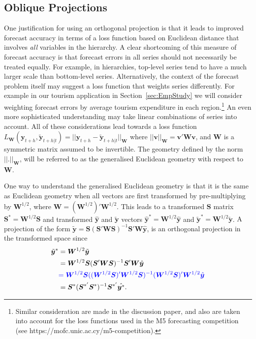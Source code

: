 \documentclass[12pt]{article}
\theoremstyle{definition}
\begin{document}
\subsection{Oblique Projections}\label{sec:oblique}

One justification for using an orthogonal projection is that it leads to improved forecast accuracy in terms of {\color{blue} a loss function based on Euclidean distance that involves \emph{all} variables in the hierarchy.} A clear shortcoming of this measure of forecast accuracy is that forecast errors in all series should not necessarily be treated equally. For example, in hierarchies, top-level series tend to have a much larger scale than bottom-level series.  {\color{blue} Alternatively, the context of the forecast problem itself may suggest a loss function that weights series differently.  For example in our tourism application in Section~\ref{sec:EmpStudy} we will consider weighting forecast errors by average tourism expenditure in each region.}\footnote{Similar consideration are made in the \cite{KouAth2019_Intermittent} discussion paper, and also are taken into account for the loss functions used in the M5 forecasting competition (see https://mofc.unic.ac.cy/m5-competition).}  An even more sophisticated understanding may take {\color{blue}linear combinations} of series into account. All of these considerations lead towards {\color{blue} a loss function $L_{\bm W}(\bm{y}_{t+h},\tilde{\bm{y}}_{t+h|t})=||{\bm{y}_{t+h}-\tilde{\bm{y}}_{t+h|t}}||_{\bm{W}}$ where $||\bm{v}||_{\bm{W}}=\bm{v}'\bm{W}\bm{v}$, and $\bm{W}$ is a symmetric matrix assumed to be invertible.  The geometry defined by the norm $||.||_{\bm{W}}$, will be referred to as the generalised Euclidean geometry with respect to $\bm{W}$. }

One way to understand the generalised Euclidean geometry is that it is the same as Euclidean geometry when all vectors are first transformed by pre-multiplying by $\bm{W}^{1/2}$, {\color{blue} where $\bm{W}=(\bm{W}^{1/2})'\bm{W}^{1/2}$}. This leads to a transformed $\bm{S}$ matrix $\bm{S}^*=\bm{W}^{1/2}\bm{S}$ and transformed $\hat{\bm{y}}$ and $\tilde{\bm{y}}$ vectors $\hat{\bm{y}}^*=\bm{W}^{1/2}\hat{\bm{y}}$ and $\tilde{\bm{y}}^*=\bm{W}^{1/2}\tilde{\bm{y}}$. {\color{blue} A projection of the form $\tilde{\bm{y}}=\bm{S}(\bm{S}'\bm{W}\bm{S})^{-1}\bm{S}'\bm{W}\hat{\bm{y}}$, is an} orthogonal projection in the transformed space since
\begin{align*}
  \tilde{\bm{y}}^*
    & = \bm{W}^{1/2}\tilde{\bm{y}} \\
    & = \bm{W}^{1/2}\bm{S}(\bm{S}'\bm{W}\bm{S})^{-1}\bm{S}'\bm{W}\hat{\bm{y}} \\
    &{\color{blue} = \bm{W}^{1/2}\bm{S}((\bm{W}^{1/2}\bm{S})'\bm{W}^{1/2}\bm{S})^{-1}(\bm{W}^{1/2}\bm{S})'\bm{W}^{1/2}\hat{\bm{y}}}\\
    & = \bm{S}^*(\bm{S}^{*'}\bm{S}^*)^{-1}\bm{S}^{*'}\hat{\bm{y}^*}.
\end{align*}
\end{document}
